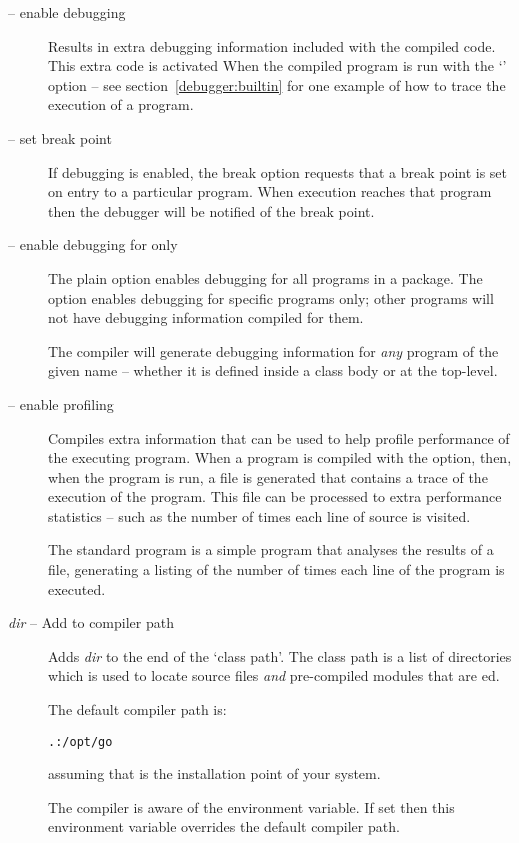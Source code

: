 \begin{description}
\item[ -- enable debugging]
Results in extra debugging information included with the compiled code.  This extra code is activated When the compiled program is run with the `' option -- see section~\vref{debugger:builtin} for one example of how to trace the execution of a \go program.

\item[ -- set break point]
If debugging is enabled, the break option requests that a break point is set on entry to a particular program. When execution reaches that program then the debugger will be notified of the break point.

\item[ -- enable debugging for  only]
The plain  option enables debugging for all programs in a package. The  option enables debugging for specific programs only; other programs will not have debugging information compiled for them.

\begin{aside}
The compiler will generate debugging information for \emph{any} program of the given name -- whether it is defined inside a class body or at the top-level.
\end{aside}

\item[ -- enable profiling]
Compiles extra information that can be used to help profile performance of the executing program. When a program is compiled with the  option, then, when the program is run, a file  is generated that contains a trace of the execution of the program. This file can be processed to extra performance statistics -- such as the number of times each line of source is visited.

The standard \go program  is a simple program that analyses the results of a  file, generating a listing of the number of times each line of the program is executed.

\item[ \emph{dir} -- Add to compiler path]
Adds \emph{dir} to the end of the `class path'. The class path is a list of directories which is used to locate source files \emph{and} pre-compiled modules that are ed.

The default compiler path is:
\begin{alltt}
.:/opt/go
\end{alltt}
assuming that  is the installation point of your \go system.


The compiler is aware of the  environment variable. If set then this environment variable overrides the default compiler path.

\end{description}

